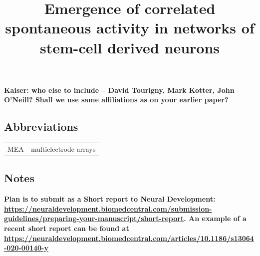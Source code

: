 \documentclass{bmcart}
\newcommand{\thetitle}{Emergence of correlated spontaneous activity in
  networks of stem-cell derived neurons}
\begin{document}
\begin{frontmatter}

\begin{fmbox}

\title{\thetitle}

\author[
   addressref={aff1},
   noteref={n1}
]{ }

\author[
   addressref={aff2},
   noteref={n1}
]{ }

\author[
   addressref={aff2},
   noteref={n2},
   email={sje30@cam.ac.uk}
]{ }

\address[id=aff1]{
    ,
    ,
    ,
}

\address[id=aff2]{
    ,
    ,
    ,
}

\textbf{Kaiser: who else to include -- David Tourigny, Mark Kotter,
  John O'Neill?  Shall we use same affiliations as on your earlier
  paper? \cite{Tourigny2019-lk}}

\begin{artnotes}


\subsection*{Abbreviations}
\begin{tabular}{ll}
MEA & multielectrode arrays\\
\end{tabular}

\subsection*{Notes}
\textbf{Plan is to submit as a Short report to Neural Development:
  \url{https://neuraldevelopment.biomedcentral.com/submission-guidelines/preparing-your-manuscript/short-report}.
  An example of a recent short report can be found at 
\url{https://neuraldevelopment.biomedcentral.com/articles/10.1186/s13064-020-00140-y}}


\end{artnotes}
\end{fmbox}
\end{frontmatter}
\end{document}
